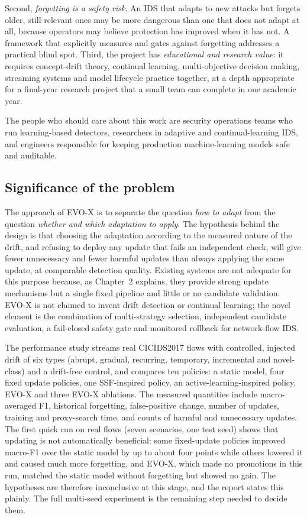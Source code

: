 \documentclass{article}
\begin{document}
Second, \emph{forgetting is a safety risk}. An IDS that adapts to new attacks but forgets older, still-relevant ones may be more dangerous than one that does not adapt at all, because operators may believe protection has improved when it has not. A framework that explicitly measures and gates against forgetting addresses a practical blind spot. Third, the project has \emph{educational and research value}: it requires concept-drift theory, continual learning, multi-objective decision making, streaming systems and model lifecycle practice together, at a depth appropriate for a final-year research project that a small team can complete in one academic year.

The people who should care about this work are security operations teams who run learning-based detectors, researchers in adaptive and continual-learning IDS, and engineers responsible for keeping production machine-learning models safe and auditable.

\subsection{Significance of the problem}

The approach of EVO-X is to separate the question \emph{how to adapt} from the question \emph{whether and which adaptation to apply}. The hypothesis behind the design is that choosing the adaptation according to the measured nature of the drift, and refusing to deploy any update that fails an independent check, will give fewer unnecessary and fewer harmful updates than always applying the same update, at comparable detection quality. Existing systems are not adequate for this purpose because, as Chapter~2 explains, they provide strong update mechanisms but a single fixed pipeline and little or no candidate validation. EVO-X is not claimed to invent drift detection or continual learning; the novel element is the combination of multi-strategy selection, independent candidate evaluation, a fail-closed safety gate and monitored rollback for network-flow IDS.

The performance study streams real CICIDS2017 flows with controlled, injected drift of six types (abrupt, gradual, recurring, temporary, incremental and novel-class) and a drift-free control, and compares ten policies: a static model, four fixed update policies, one SSF-inspired policy, an active-learning-inspired policy, EVO-X and three EVO-X ablations. The measured quantities include macro-averaged F1, historical forgetting, false-positive change, number of updates, training and proxy-search time, and counts of harmful and unnecessary updates. The first quick run on real flows (seven scenarios, one test seed) shows that updating is not automatically beneficial: some fixed-update policies improved macro-F1 over the static model by up to about four points while others lowered it and caused much more forgetting, and EVO-X, which made no promotions in this run, matched the static model without forgetting but showed no gain. The hypotheses are therefore inconclusive at this stage, and the report states this plainly. The full multi-seed experiment is the remaining step needed to decide them.
\end{document}
